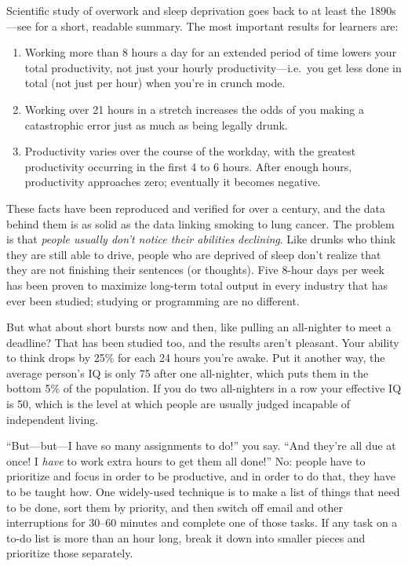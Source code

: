 Scientific study of overwork and sleep deprivation goes back to at least the 1890s---see
\cite{Robi2005} for a short, readable summary.
The most important results for learners are:

\begin{enumerate}

\item
  Working more than 8 hours a day for an extended period of time
  lowers your total productivity,
  not just your hourly productivity---i.e.\ you get less done in total (not just per hour)
  when you're in crunch mode.

\item
  Working over 21 hours in a stretch increases the odds of you making a catastrophic error
  just as much as being legally drunk.

\item
  Productivity varies over the course of the workday,
  with the greatest productivity occurring in the first 4 to 6 hours.
  After enough hours,
  productivity approaches zero;
  eventually it becomes negative.

\end{enumerate}

These facts have been reproduced and verified for over a century,
and the data behind them is as solid as the data linking smoking to lung cancer.
The problem is that
\emph{people usually don't notice their abilities declining}.
Like drunks who think they are still able to drive,
people who are deprived of sleep don't realize that
they are not finishing their sentences (or thoughts).
Five 8-hour days per week has been proven to maximize long-term total output
in every industry that has ever been studied;
studying or programming are no different.

But what about short bursts now and then,
like pulling an all-nighter to meet a deadline?
That has been studied too,
and the results aren't pleasant.
Your ability to think drops by 25\% for each 24 hours you're awake.
Put it another way,
the average person's IQ is only 75 after one all-nighter,
which puts them in the bottom 5\% of the population.
If you do two all-nighters in a row your effective IQ is 50,
which is the level at which people are usually judged incapable of independent living.

``But---but---I have so many assignments to do!'' you say.
``And they're all due at once!
I \emph{have} to work extra hours to get them all done!''
No:
people have to prioritize and focus in order to be productive,
and in order to do that,
they have to be taught how.
One widely-used technique is to make a list of things that need to be done,
sort them by priority,
and then switch off email and other interruptions for 30--60 minutes
and complete one of those tasks.
If any task on a to-do list is more than an hour long,
break it down into smaller pieces and prioritize those separately.

